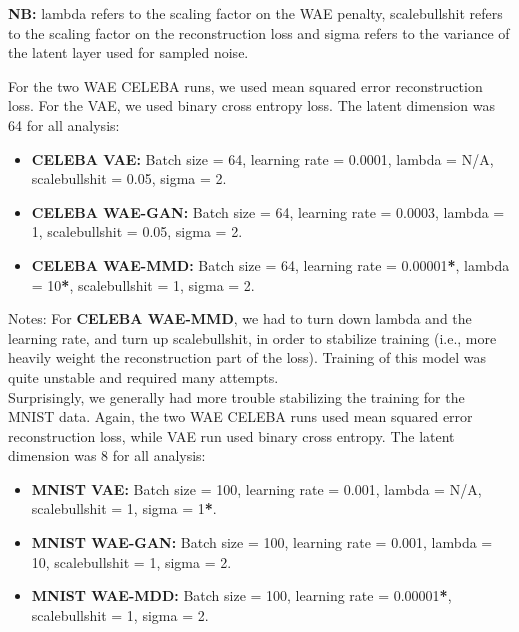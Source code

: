 \documentclass[12pt,english]{amsart}
\begin{document}
\textbf{NB:} lambda refers to the scaling factor on the WAE penalty,
scalebullshit refers to the scaling factor on the reconstruction loss and sigma
refers to the variance of the latent layer used for sampled noise.

For the two WAE CELEBA runs, we used mean squared error reconstruction loss.
For the VAE, we used binary cross entropy loss. The latent dimension was 64
for all analysis: \\

\begin{itemize}

    \item{\textbf{CELEBA VAE:} Batch size = 64, learning rate = 0.0001,
          lambda = N/A, scalebullshit = 0.05, sigma = 2.}

    \item{\textbf{CELEBA WAE-GAN:} Batch size = 64, learning rate = 0.0003,
          lambda = 1, scalebullshit = 0.05, sigma = 2.}

    \item{\textbf{CELEBA WAE-MMD:} Batch size = 64,
          learning rate = 0.00001\textbf{*}, lambda = 10\textbf{*},
          scalebullshit = 1, sigma = 2.}

\end{itemize}

Notes: For \textbf{CELEBA WAE-MMD}, we had to turn down lambda and the learning
rate, and turn up scalebullshit, in order to stabilize training (i.e., more
heavily weight the reconstruction part of the loss). Training of this model was
quite unstable and required many attempts. \\

Surprisingly, we generally had more trouble stabilizing the training for the
MNIST data. Again, the two WAE CELEBA runs used mean squared error
reconstruction loss, while VAE run used binary cross entropy. The latent
dimension was 8 for all analysis: \\

\begin{itemize}
    \item{\textbf{MNIST VAE:} Batch size = 100, learning rate = 0.001,
          lambda = N/A, scalebullshit = 1, sigma = 1\textbf{*}.} \\

    \item{\textbf{MNIST WAE-GAN:} Batch size = 100, learning rate = 0.001,
          lambda = 10, scalebullshit = 1, sigma = 2.} \\

    \item{\textbf{MNIST WAE-MDD:} Batch size = 100,
          learning rate = 0.00001\textbf{*}, scalebullshit = 1, sigma = 2.} \\

\end{itemize}
\end{document}
